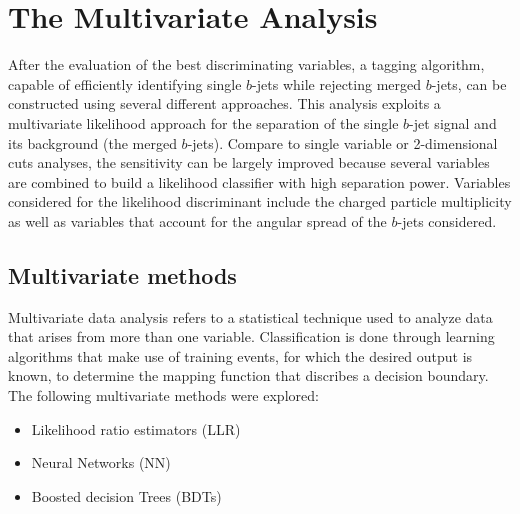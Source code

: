 %
\chapter{The Multivariate Analysis}\label{ch:mva}
%

After the evaluation of the best discriminating variables, %
a tagging algorithm, capable of efficiently identifying single $b$-jets while rejecting merged $b$-jets, can be constructed using several different approaches.  
This analysis exploits a multivariate likelihood approach for the separation of the single $b$-jet signal and its background (the merged $b$-jets). Compare to single variable or 2-dimensional cuts analyses, the sensitivity can be largely improved because several variables are combined to build a likelihood classifier with high separation power.   Variables considered for the likelihood discriminant include the charged particle multiplicity as well as variables that account for the angular spread of the $b$-jets considered. 

\section{Multivariate methods}\label{sec:mvamethods}

Multivariate data analysis refers to a statistical technique used to analyze data that arises from more than one variable.  Classification is done through learning algorithms that make use of training events,  for which the desired output is known, to determine the mapping function that discribes a decision boundary. The following multivariate methods were explored: %

\begin{itemize}\addtolength{\itemsep}{-0.4\baselineskip}
\item
Likelihood ratio estimators (LLR)
\item
Neural Networks (NN)
\item
Boosted decision Trees (BDTs)
\end{itemize}

